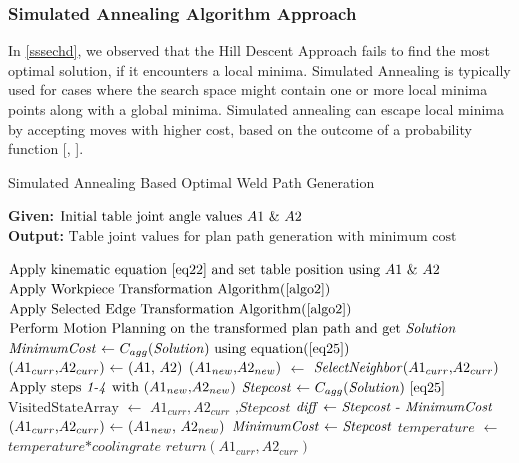 \subsubsection{Simulated Annealing Algorithm Approach}
\label{sssec:sa}
In \ref{sssechd}, we observed that the Hill Descent Approach fails to find the most optimal solution, if it encounters a local minima. Simulated Annealing is typically used for cases where the search space might contain one or more local minima points along with a global minima. Simulated annealing can escape local minima by accepting moves with higher cost, based on the outcome of a probability function [\citet{vanLaarhoven1987},\citet{russell2009artificial} ]. 
\begin{algorithm}[!ht]
	\caption{Simulated Annealing Based Optimal Weld Path Generation}
	\label{algo5}
	\textbf{Given:} $ \text{Initial table joint angle values \textit{$A1$} \& \textit{$A2$}}$ \\ 
	\textbf{Output:} $ \text{Table joint values for plan path generation with minimum cost}$
	
	\begin{algorithmic}[1]
		\State $\text{Apply kinematic equation \ref{eq22} and set table position using \textit{$A1$} \& \textit{$A2$}}$
		\State $\text{Apply Workpiece Transformation Algorithm(\ref{algo2})}$
		\State $\text{Apply Selected Edge Transformation Algorithm(\ref{algo2})}$
		\State $\text{Perform Motion Planning on the transformed plan path and get \textit{Solution}}$
		\State $\text{\textit{MinimumCost} $\gets$ $C_{agg}$(\textit{Solution}) using equation(\ref{eq25})}$
		\State $\text{(\textit{$A1_{curr}$},\textit{$A2_{curr}$}) $\gets$ (\textit{$A1$}, \textit{$A2$})}$
		\State $\text{(\textit{$A1_{new}$},\textit{$A2_{new}$})}$ $\gets$ $\text{\textit{SelectNeighbor}(\textit{$A1_{curr}$},\textit{$A2_{curr}$})}$
		\State $\text{Apply steps \textit{1-4} with (\textit{$A1_{new}$},\textit{$A2_{new}$})}$
		\State $\text{\textit{Stepcost} $\gets$ $C_{agg}$(\textit{Solution}) \ref{eq25}}$
		\State $\text{VisitedStateArray}$ $\gets$ $\textit{$A1_{curr}$},\textit{$A2_{curr}$}$ $\textit{,Stepcost}$ 
		\State $\text{\textit{diff} $\gets$ \textit{Stepcost} - \textit{MinimumCost}}$
		\State $\text{(\textit{$A1_{curr}$},\textit{$A2_{curr}$}) $\gets$ (\textit{$A1_{new}$}, \textit{$A2_{new}$})}$
		\State $\text{\textit{MinimumCost} $\gets$ \textit{Stepcost}}$
		\EndIf
		\State $\textit{temperature}$ $\gets$ $\textit{temperature*coolingrate}$
		\EndWhile %
		\State $\textit{return} (\textit{$A1_{curr}$},\textit{$A2_{curr}$})$      
	\end{algorithmic}
\end{algorithm}\\
